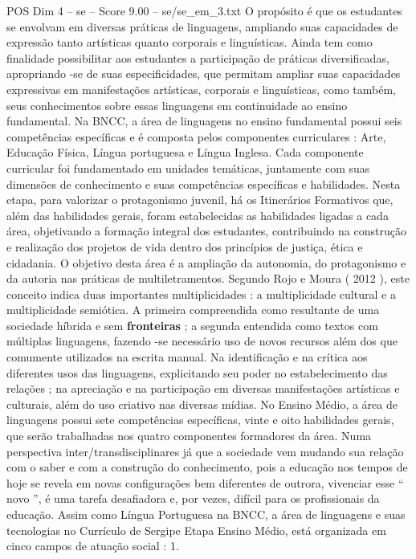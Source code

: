 \begin{textsample}{POS Dim 4 – se – Score 9.00 – se/se\_em\_3.txt}
O propósito é que os estudantes se envolvam em diversas práticas de linguagens, ampliando suas capacidades de expressão tanto artísticas quanto corporais e linguísticas.
Ainda tem como finalidade possibilitar aos estudantes a participação de práticas diversificadas, apropriando -se de suas especificidades, que permitam ampliar suas capacidades expressivas em manifestações artísticas, corporais e linguísticas, como também, seus conhecimentos sobre essas linguagens em continuidade ao ensino fundamental.
Na BNCC, a área de linguagens no ensino fundamental possui seis competências específicas e é composta pelos componentes curriculares : Arte, Educação Física, Língua portuguesa e Língua Inglesa.
Cada componente curricular foi fundamentado em unidades temáticas, juntamente com suas dimensões de conhecimento e suas competências específicas e habilidades.
Nesta etapa, para valorizar o protagonismo juvenil, há os Itinerários Formativos que, além das habilidades gerais, foram estabelecidas as habilidades ligadas a cada área, objetivando a formação integral dos estudantes, contribuindo na construção e realização dos projetos de vida dentro dos princípios de justiça, ética e cidadania.
O objetivo desta área é a ampliação da autonomia, do protagonismo e da autoria nas práticas de multiletramentos.
Segundo Rojo e Moura ( 2012 ), este conceito indica duas importantes multiplicidades : a multiplicidade cultural e a multiplicidade semiótica.
A primeira compreendida como resultante de uma sociedade híbrida e sem \textbf{fronteiras} ; a segunda entendida como textos com múltiplas linguagens, fazendo -se necessário uso de novos recursos além dos que comumente utilizados na escrita manual.
Na identificação e na crítica aos diferentes usos das linguagens, explicitando seu poder no estabelecimento das relações ; na apreciação e na participação em diversas manifestações artísticas e culturais, além do uso criativo nas diversas mídias.
No Ensino Médio, a área de linguagens possui sete competências específicas, vinte e oito habilidades gerais, que serão trabalhadas nos quatro componentes formadores da área.
Numa perspectiva inter/transdisciplinares já que a sociedade vem mudando sua relação com o saber e com a construção do conhecimento, pois a educação nos tempos de hoje se revela em novas configurações bem diferentes de outrora, vivenciar esse “ novo ”, é uma tarefa desafiadora e, por vezes, difícil para os profissionais da educação.
Assim como Língua Portuguesa na BNCC, a área de linguagens e suas tecnologias no Currículo de Sergipe Etapa Ensino Médio, está organizada em cinco campos de atuação social : 1.

\end{textsample}
